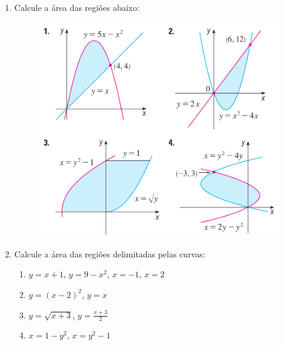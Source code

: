 \documentclass[a4paper,5pt]{amsbook}
\newcommand{\ds}{\displaystyle}
\begin{document}
\vspace{1cm}
\begin{enumerate}
    \vspace{0.5cm}
    \item Calcule a \'area das regi\~oes abaixo:
        \begin{figure}[h]
            \includegraphics[scale=0.3]{lista-03-fig1.png}
        \end{figure}

    \vspace{0.5cm}
    \item Calcule a \'area das regi\~oes delimitadas pelas curvas:
        \begin{enumerate}
            \item $y=x+1$, $y=9-x^2$, $x=-1$, $x=2$
            \item $y=(x-2)^2$, $y=x$
            \item $y=\sqrt{x+3}$, $y=\ds\frac{x+3}{2}$
            \item $x=1-y^2$, $x=y^2-1$
        \end{enumerate}


\end{enumerate}
\end{document}

